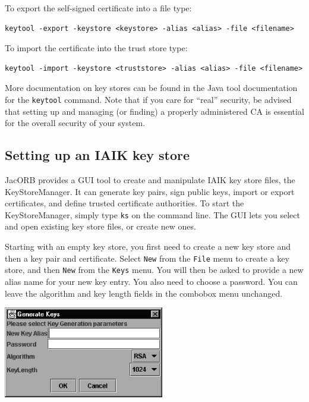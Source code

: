To export the self-signed certificate into a file type:
\begin{verbatim}
keytool -export -keystore <keystore> -alias <alias> -file <filename>
\end{verbatim}
To import the certificate into the trust store type:
\begin{verbatim}
keytool -import -keystore <truststore> -alias <alias> -file <filename> 
\end{verbatim}

More documentation on key stores  can be found in the Java tool
documentation for the {\tt keytool}  command. Note that if you care
for ``real'' security,  be advised  that setting  up  and managing
(or finding)  a properly administered CA is essential for the overall
security of your system.


\subsection{Setting up an IAIK key store}

JacORB provides a  GUI tool to create and  manipulate IAIK key store
files, the  KeyStoreManager. It  can generate  key pairs,  sign
public keys, import  or   export  certificates,  and   define  trusted
certificate authorities. To start the KeyStoreManager, simply type
{\tt ks} on the command  line. The GUI  lets you  select and  open
existing  key store files, or create new ones.

Starting with an  empty key store, you first need to  create a new key
store and then  a key pair and certificate. Select  {\tt New} from the
{\tt File}  menu to create  a key store,  and then {\tt New}  from the
{\tt Keys} menu.   You will then be asked to provide  a new alias name
for your  new key entry. You also  need to choose a  password. You can
leave  the  algorithm  and  key  length fields  in  the  combobox  menu
unchanged.

\bigskip
\begin{center}
  \includegraphics[width=7cm]{SSL/Generate}
\end{center}

